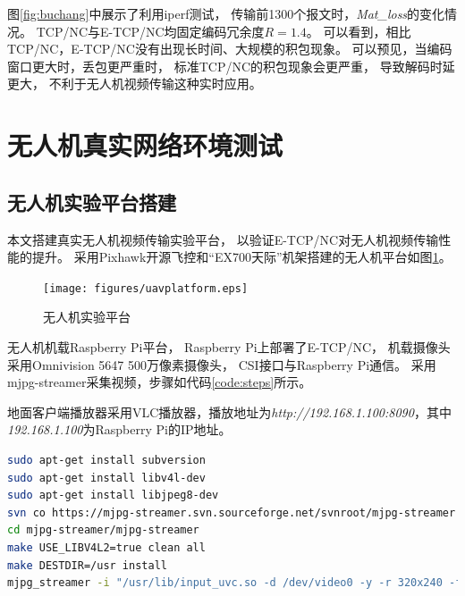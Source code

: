 \par
图\ref{fig:buchang}中展示了利用iperf测试，
传输前1300个报文时，\emph{Mat\_loss}的变化情况。
TCP/NC与E-TCP/NC均固定编码冗余度$R=1.4$。
可以看到，相比TCP/NC，E-TCP/NC没有出现长时间、大规模的积包现象。
可以预见，当编码窗口更大时，丢包更严重时，
标准TCP/NC的积包现象会更严重，
导致解码时延更大，
不利于无人机视频传输这种实时应用。
\section{无人机真实网络环境测试}
\subsection{无人机实验平台搭建}
本文搭建真实无人机视频传输实验平台，
以验证E-TCP/NC对无人机视频传输性能的提升。
采用Pixhawk开源飞控和“EX700天际”机架搭建的无人机平台如图\ref{fig:uavpingtai}。

\begin{figure}[htbp]
	\centering
	\texttt{[image: figures/uavplatform.eps]}
	\caption{无人机实验平台}
	\label{fig:uavpingtai}
\end{figure}



无人机机载Raspberry Pi平台，
Raspberry Pi上部署了E-TCP/NC，
机载摄像头采用Omnivision 5647 500万像素摄像头，
CSI接口与Raspberry Pi通信。
采用mjpg-streamer采集视频，步骤如代码\ref{code:steps}所示。

\par
地面客户端播放器采用VLC播放器，播放地址为\emph{http://192.168.1.100:8090}，其中\emph{192.168.1.100}为Raspberry Pi的IP地址。

\begin{lstlisting}[float,caption=摄像头配置步骤,label={code:steps},language={bash}]
sudo apt-get install subversion
sudo apt-get install libv4l-dev
sudo apt-get install libjpeg8-dev
svn co https://mjpg-streamer.svn.sourceforge.net/svnroot/mjpg-streamer mjpg-streamer
cd mjpg-streamer/mjpg-streamer
make USE_LIBV4L2=true clean all
make DESTDIR=/usr install
mjpg_streamer -i "/usr/lib/input_uvc.so -d /dev/video0 -y -r 320x240 -f 15" -o "/usr/lib/output_http.so -p 8090 -w ./www"
\end{lstlisting}
